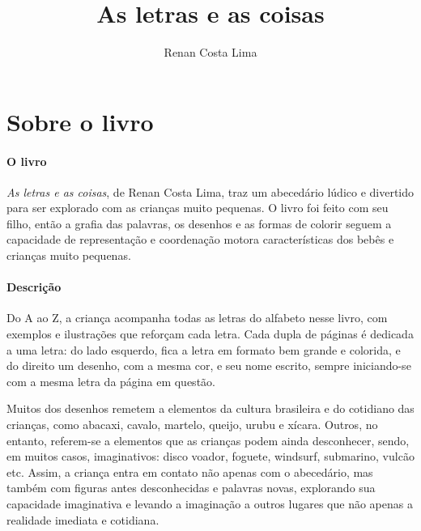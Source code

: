 \documentclass[11pt]{extarticle}
\newcommand{\AutorLivro}{Renan Costa Lima}
\newcommand{\TituloLivro}{As letras e as coisas}
\newcommand{\colaborador}{Paulo Pompermaier e Renier Silva}
\begin{document}
\title{\TituloLivro}
\author{\AutorLivro}
\def\authornotes{\colaborador}

\date{}
\maketitle


\tableofcontents



\section{Sobre o livro}

\paragraph{O livro} \textit{As letras e as coisas}, de Renan Costa Lima, traz um abecedário lúdico e divertido para ser explorado com as crianças muito pequenas. O livro foi feito com seu filho, então a grafia das palavras, os desenhos e as formas de colorir seguem a capacidade de representação e coordenação motora características dos bebês e crianças muito pequenas.

\paragraph{Descrição} Do A ao Z, a criança acompanha todas as letras do alfabeto nesse livro, com exemplos e ilustrações que reforçam cada letra. Cada dupla de páginas é dedicada a uma letra: do lado esquerdo, fica a letra em formato bem grande e colorida, e do direito um desenho, com a mesma cor, e seu nome escrito, sempre iniciando-se com a mesma letra da página em questão.

Muitos dos desenhos remetem a elementos da cultura brasileira e do cotidiano das crianças, como abacaxi, cavalo, martelo, queijo, urubu e xícara. Outros, no entanto, referem-se a elementos que as crianças podem ainda desconhecer, sendo, em muitos casos, imaginativos: disco voador, foguete, windsurf, submarino, vulcão etc. Assim, a criança entra em contato não apenas com o abecedário, mas também com figuras antes desconhecidas e palavras novas, explorando sua capacidade imaginativa e levando a imaginação a outros lugares que não apenas a realidade imediata e cotidiana.
\end{document}
